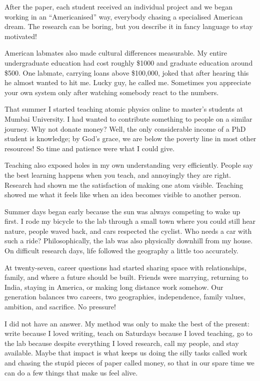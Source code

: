\documentclass[11pt,twoside,openany]{book}
\newcommand{\scene}{\par\vspace{0.7em}{\centering\color{accent}\rule{0.85cm}{0.6pt}\par}\vspace{0.5em}\noindent\ignorespaces}
\begin{document}
After the paper, each student received an individual project and we began
working in an ``Americanised'' way, everybody chasing a specialised American
dream. The research can be boring, but you describe it in fancy language to
stay motivated!

American labmates also made cultural differences measurable. My entire
undergraduate education had cost roughly \$1000 and graduate education around
\$500. One labmate, carrying loans above \$100,000, joked that after hearing
this he almost wanted to hit me. Lucky guy, he called me. Sometimes you
appreciate your own system only after watching somebody react to the numbers.

That summer I started teaching atomic physics online to master's students at
Mumbai University. I had wanted to contribute something to people on a
similar journey. Why not donate money? Well, the only considerable income of
a PhD student is knowledge; by God's grace, we are below the poverty line in
most other resources! So time and patience were what I could give.

Teaching also exposed holes in my own understanding very efficiently. People
say the best learning happens when you teach, and annoyingly they are right.
Research had shown me the satisfaction of making one atom visible. Teaching
showed me what it feels like when an idea becomes visible to another person.

\scene

Summer days began early because the sun was always competing to wake up first.
I rode my bicycle to the lab through a small town where you could still hear
nature, people waved back, and cars respected the cyclist. Who needs a car
with such a ride? Philosophically, the lab was also physically downhill from
my house. On difficult research days, life followed the geography a little
too accurately.

At twenty-seven, career questions had started sharing space with relationships,
family, and where a future should be built. Friends were marrying, returning
to India, staying in America, or making long distance work somehow. Our
generation balances two careers, two geographies, independence, family
values, ambition, and sacrifice. No pressure!

I did not have an answer. My method was only to make the best of the present:
write because I loved writing, teach on Saturdays because I loved teaching,
go to the lab because despite everything I loved research, call my people,
and stay available. Maybe that impact is what keeps us doing the silly tasks
called work and chasing the stupid pieces of paper called money, so that in
our spare time we can do a few things that make us feel alive.
\end{document}
